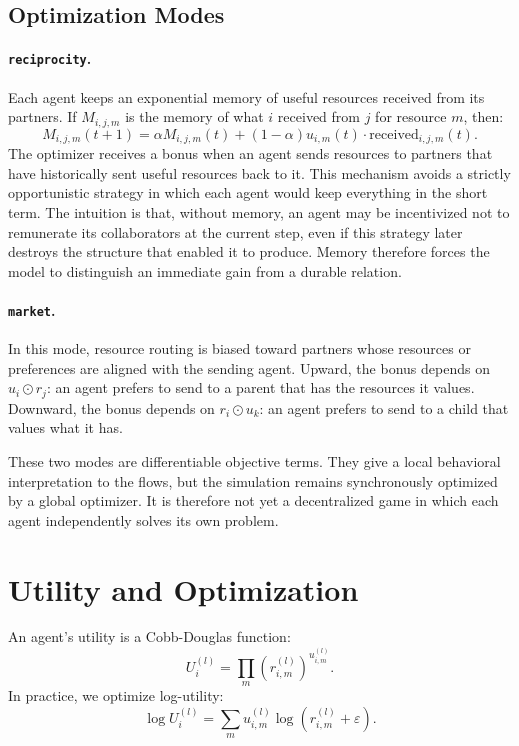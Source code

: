 \documentclass[11pt]{article}
\begin{document}
\subsection{Optimization Modes}

\paragraph{\texttt{reciprocity}.}
Each agent keeps an exponential memory of useful resources received from its partners. If $M_{i,j,m}$ is the memory of what $i$ received from $j$ for resource $m$, then:
\begin{equation}
    M_{i,j,m}(t+1)=\alpha M_{i,j,m}(t)+(1-\alpha)u_{i,m}(t) \cdot \mathrm{received}_{i,j,m}(t).
\end{equation}
The optimizer receives a bonus when an agent sends resources to partners that have historically sent useful resources back to it. This mechanism avoids a strictly opportunistic strategy in which each agent would keep everything in the short term. The intuition is that, without memory, an agent may be incentivized not to remunerate its collaborators at the current step, even if this strategy later destroys the structure that enabled it to produce. Memory therefore forces the model to distinguish an immediate gain from a durable relation.

\paragraph{\texttt{market}.}
In this mode, resource routing is biased toward partners whose resources or preferences are aligned with the sending agent. Upward, the bonus depends on $u_i \odot r_j$: an agent prefers to send to a parent that has the resources it values. Downward, the bonus depends on $r_i \odot u_k$: an agent prefers to send to a child that values what it has.

These two modes are differentiable objective terms. They give a local behavioral interpretation to the flows, but the simulation remains synchronously optimized by a global optimizer. It is therefore not yet a decentralized game in which each agent independently solves its own problem.

\section{Utility and Optimization}

An agent's utility is a Cobb-Douglas function:
\begin{equation}
    U_i^{(l)} = \prod_m \left(r_{i,m}^{(l)}\right)^{u_{i,m}^{(l)}}.
\end{equation}
In practice, we optimize log-utility:
\begin{equation}
    \log U_i^{(l)} = \sum_m u_{i,m}^{(l)}\log(r_{i,m}^{(l)}+\varepsilon).
\end{equation}
\end{document}
